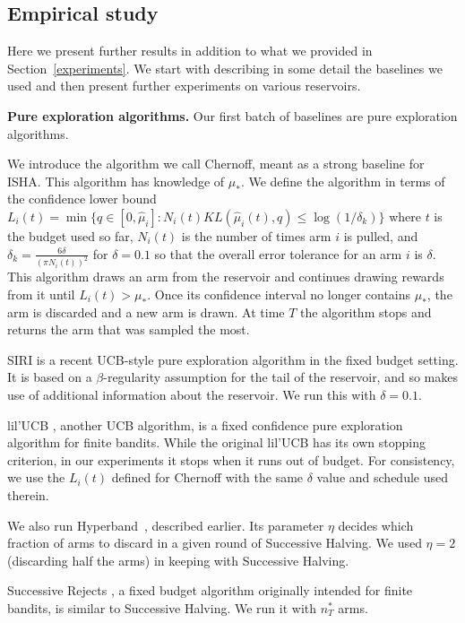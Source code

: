 \subsection {Empirical study}\label{appendix:experiments}

Here we present further results in addition to what we provided in Section~\ref{experiments}. We start with describing in some detail the baselines we used and then present further experiments on various reservoirs.

\textbf{Pure exploration algorithms.}
Our first batch of baselines are pure exploration algorithms.

We introduce the algorithm we call Chernoff, meant as a strong baseline
for ISHA. This algorithm has knowledge of $\mu_*$.
We define the algorithm in terms of the confidence lower bound $L_i(t) = \min \{q \in [0,\widehat{\mu}_{i}] : N_i(t) KL(\hat{\mu}_i(t),q) \le \log(1/\delta_k) \}\label{kl-ub}$
where $t$ is the budget used so far,
$N_i(t)$ is the number of times arm $i$ is pulled,
and $\delta_k = \frac{6\delta}{(\pi N_i(t))^2}$ for $\delta=0.1$ so that the overall error tolerance for an arm $i$ is $\delta$.
This algorithm draws an arm from the reservoir and continues drawing
rewards from it until $L_i(t) > \mu_*$. Once its confidence interval no longer contains $\mu_*$, the arm is discarded and a new arm is drawn.
At time $T$ the algorithm stops and returns the arm that was sampled the most. 

SIRI \citep{DBLP:journals/corr/CarpentierV15} is a recent UCB-style pure exploration algorithm in the fixed budget setting.
It is based on a $\beta$-regularity assumption for the tail of the
reservoir, and so makes use of additional information about the reservoir.
We run this with $\delta=0.1$.

lil'UCB \citep{Jamieson2014lilU}, another UCB algorithm, is a fixed confidence pure exploration algorithm for finite bandits. While the original lil'UCB has its own stopping criterion, in our experiments it stops when it runs out of budget. For consistency, we use the $L_i(t)$ defined for Chernoff with the same $\delta$ value and schedule used therein.

We also run Hyperband~\citep{li2017hyperband}, described earlier.
Its parameter $\eta$ decides which fraction of arms to discard in a given round of Successive Halving. We used $\eta=2$ (discarding half the arms) in keeping with Successive Halving.

Successive Rejects \citep{DBLP:conf/colt/AudibertBM10}, a fixed budget algorithm originally intended for finite bandits, is similar to Successive Halving. We run it with $n^*_T$ arms. 

